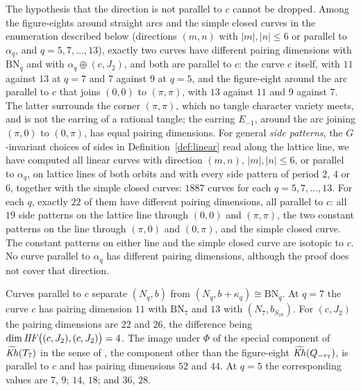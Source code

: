 \begin{remark}\label{rem:exceptional}
The hypothesis that the direction is not parallel to $c$ cannot be dropped.  Among the figure-eights around
straight arcs and the simple closed curves in the enumeration described below (directions $(m,n)$ with
$|m|,|n|\le6$ or parallel to $\alpha_q$, and $q=5,7,\dots,13$), exactly two curves have different pairing
dimensions with $\mathrm{BN}_q$ and with $\alpha_q\oplus(c,J_2)$, and both are parallel to $c$: the curve $c$ itself, with $11$ against
$13$ at $q=7$ and $7$ against $9$ at $q=5$, and the figure-eight around the arc parallel to $c$ that
joins $(0,0)$ to $(\pi,\pi)$, with $13$ against $11$ and $9$ against $7$.  The latter surrounds the corner
$(\pi,\pi)$, which no tangle character variety meets, and is not the earring of a rational tangle;
the earring $E_{-1}$, around the arc joining $(\pi,0)$ to $(0,\pi)$, has equal pairing dimensions.  For
general \emph{side patterns}, the $G$-invariant choices of sides in Definition~\ref{def:linear} read along
the lattice line, we have computed all linear curves with direction $(m,n)$, $|m|,|n|\le6$, or parallel to
$\alpha_q$, on lattice lines of both orbits and with every side pattern of period $2$, $4$ or $6$,
together with the simple closed curves: $1887$ curves for each $q=5,7,\dots,13$.  For each $q$,
exactly $22$ of them have different pairing dimensions, all parallel to $c$: all $19$ side patterns on the lattice line
through $(0,0)$ and $(\pi,\pi)$, the two constant patterns on the line through $(\pi,0)$ and
$(0,\pi)$, and the simple closed curve.  The constant patterns on either line and the simple closed
curve are isotopic to $c$.  No curve parallel to
$\alpha_q$ has different pairing dimensions, although the proof does not cover that direction.
\end{remark}

\begin{remark}\label{rem:sharpness}
Curves parallel to $c$ separate $(N_q,b)$ from $(N_q,b+\kappa_q)\cong\mathrm{BN}_q$.  At $q=7$ the
curve $c$ has pairing dimension $11$ with $\mathrm{BN}_7$ and $13$ with $(N_7,b_{S_{18}})$.  For $(c,J_2)$
the pairing dimensions are $22$ and $26$, the difference being $\dim\mathit{HF}\bigl((c,J_2),(c,J_2)\bigr)=4$.  The
image under $\Phi$ of the special component of $\widetilde{\mathit{Kh}}(T_7)$ in the sense of \cite[\S3.4,
Def.~3.11]{KWZmut}, the component other than the figure-eight $\widetilde{\mathit{Kh}}(Q_{-r_7})$, is parallel to
$c$ and has pairing dimensions $52$ and $44$.  At $q=5$ the corresponding values are $7$, $9$; $14$, $18$; and $36$, $28$.
\end{remark}

